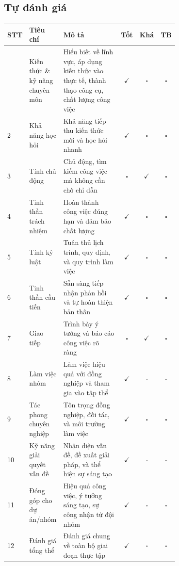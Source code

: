\documentclass[a4paper,12pt]{article}
\renewcommand{\arraystretch}{1.3}
\begin{document}
\subsection{Tự đánh giá}

\begingroup
\small
\setlength{\tabcolsep}{4pt}
\renewcommand{\arraystretch}{1.2}
\begin{longtable}{@{}p{0.03\linewidth}p{0.20\linewidth}p{0.47\linewidth}ccc@{}}
\toprule
\textbf{STT} & \textbf{Tiêu chí} & \textbf{Mô tả} & \textbf{Tốt} & \textbf{Khá} & \textbf{TB} \\
\midrule
\endhead
\bottomrule
\endfoot
1 & Kiến thức \& kỹ năng chuyên môn & Hiểu biết về lĩnh vực, áp dụng kiến thức vào thực tế, thành thạo công cụ, chất lượng công việc & $\checkmark$ & $\square$ & $\square$ \\
2 & Khả năng học hỏi & Khả năng tiếp thu kiến thức mới và học hỏi nhanh & $\checkmark$ & $\square$ & $\square$ \\
3 & Tính chủ động & Chủ động, tìm kiếm công việc mà không cần chờ chỉ dẫn & $\square$ & $\checkmark$ & $\square$ \\
4 & Tinh thần trách nhiệm & Hoàn thành công việc đúng hạn và đảm bảo chất lượng & $\checkmark$ & $\square$ & $\square$ \\
5 & Tính kỷ luật & Tuân thủ lịch trình, quy định, và quy trình làm việc & $\checkmark$ & $\square$ & $\square$ \\
6 & Tinh thần cầu tiến & Sẵn sàng tiếp nhận phản hồi và tự hoàn thiện bản thân & $\checkmark$ & $\square$ & $\square$ \\
7 & Giao tiếp & Trình bày ý tưởng và báo cáo công việc rõ ràng & $\square$ & $\checkmark$ & $\square$ \\
8 & Làm việc nhóm & Làm việc hiệu quả với đồng nghiệp và tham gia vào tập thể & $\checkmark$ & $\square$ & $\square$ \\
9 & Tác phong chuyên nghiệp & Tôn trọng đồng nghiệp, đối tác, và môi trường làm việc & $\checkmark$ & $\square$ & $\square$ \\
10 & Kỹ năng giải quyết vấn đề & Nhận diện vấn đề, đề xuất giải pháp, và thể hiện sự sáng tạo & $\checkmark$ & $\square$ & $\square$ \\
11 & Đóng góp cho dự án/nhóm & Hiệu quả công việc, ý tưởng sáng tạo, sự công nhận từ đội nhóm & $\checkmark$ & $\square$ & $\square$ \\
12 & Đánh giá tổng thể & Đánh giá chung về toàn bộ giai đoạn thực tập & $\checkmark$ & $\square$ & $\square$ \\
\end{longtable}
\endgroup


\end{document}
